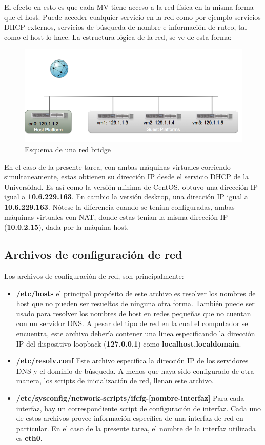 \documentclass[11pt]{article}
\begin{document}
	El efecto en esto es que cada MV tiene acceso a la red física en la misma forma que el host. Puede acceder cualquier servicio en la red como por ejemplo servicios DHCP externos, servicios de búsqueda de nombre e información de ruteo, tal como el host lo hace. La estructura lógica de la red, se ve de esta forma:

	\begin{figure}[ht]
	\center
	\includegraphics[width=0.75\linewidth]{screenshots/networking/bridge/bridge-network.png} 
	\caption{Esquema de una red bridge} 
	\end{figure}

En el caso de la presente tarea, con ambas máquinas virtuales corriendo simultaneamente, estas obtienen su dirección IP desde el servicio DHCP de la Universidad. Es así como la versión mínima de CentOS, obtuvo una dirección IP igual a \textbf{10.6.229.163}. En cambio la versión desktop, una dirección IP igual a \textbf{10.6.229.163}. Nótese la diferencia cuando se tenían configuradas, ambas máquinas virtuales con NAT, donde estas tenían la misma dirección IP (\textbf{10.0.2.15}), dada por la máquina host.

\subsection{Archivos de configuración de red}
Los archivos de configuración de red, son principalmente:
\begin{itemize}
	\item \textbf{/etc/hosts} el principal propósito de este archivo es resolver los nombres de host que no pueden ser resueltos de ninguna otra forma. También puede ser usado para resolver los nombres de host en redes pequeñas que no cuentan con un servidor DNS. A pesar del tipo de red en la cual el computador se encuentra, este archivo debería contener una linea especificando la dirección IP del dispositivo loopback (\textbf{127.0.0.1}) como \textbf{localhost.localdomain}.

	\item \textbf{/etc/resolv.conf} Este archivo especifica la dirección IP de los servidores DNS y el dominio de búsqueda. A menos que haya sido configurado de otra manera, los scripts de inicialización de red, llenan este archivo. 

	\item \textbf{/etc/sysconfig/network-scripts/ifcfg-[nombre-interfaz]} Para cada interfaz, hay un correspondiente script de configuración de interfaz. Cada uno de estos archivos provee información específica de una interfaz de red en particular. En el caso de la presente tarea, el nombre de la interfaz utilizada es \textbf{eth0}.
\end{itemize}
\end{document}
